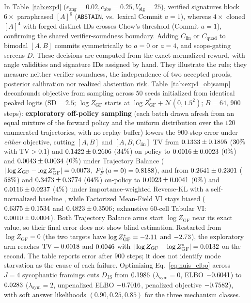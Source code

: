 \documentclass[11pt,a4paper]{article}
\theoremstyle{definition}
\theoremstyle{remark}
\newcommand{\JS}{D_{\mathrm{JS}}}
\begin{document}
In Table~\ref{tab:exp4} ($\epsilon_{\mathrm{ang}} = 0.02, c_{\mathrm{abs}} = 0.25, V_{\mathrm{sig}} = 25$), verified signatures block $6\times$ paraphrased $[A]^6$ (\texttt{ABSTAIN}, vs.\ lexical Commit $a=1$), whereas $4\times$ cloned $[A]^4$ with forged distinct IDs crosses Chow's threshold (Commit $a=1$), confirming the shared verifier-soundness boundary. Adding $C_{\mathrm{lin}}$ or $C_{\mathrm{quad}}$ to bimodal $[A, B]$ commits symmetrically to $a=0$ or $a=4$, and scope-gating screens $D$. These decisions are computed from the exact normalized reward, with angle validities and signature IDs assigned by hand. They illustrate the rule; they measure neither verifier soundness, the independence of two accepted proofs, posterior calibration nor realized abstention risk. Table~\ref{tab:exp4_objsamp} deconfounds objective from sampling across $50$ seeds initialized from identical peaked logits ($\mathrm{SD} = 2.5$; $\log Z_{\mathrm{GF}}$ starts at $\log Z_{\mathrm{GF}}^* + \mathcal{N}(0, 1.5^2)$; $B = 64$, $900$ steps): \textbf{exploratory off-policy sampling} (each batch drawn afresh from an equal mixture of the forward policy and the uniform distribution over the $120$ enumerated trajectories, with no replay buffer) lowers the $900$-step error under \emph{either} objective, cutting $[A, B]$ and $[A, B, C_{\mathrm{lin}}]$ $\mathrm{TV}$ from $0.1333 \pm 0.1895$ ($30\%$ with $\mathrm{TV}>0.1$) and $0.1422 \pm 0.2606$ ($34\%$) on-policy to $0.0016 \pm 0.0023$ ($0\%$) and $0.0043 \pm 0.0034$ ($0\%$) under Trajectory Balance ($|\log Z_{\mathrm{GF}} - \log Z_{\mathrm{GF}}^*| = 0.0073$, $P_F^\top(a=0) = 0.8188$), and from $0.2641 \pm 0.2301$ ($58\%$) and $0.3473 \pm 0.3774$ ($64\%$) on-policy to $0.0023 \pm 0.0041$ ($0\%$) and $0.0116 \pm 0.0237$ ($4\%$) under importance-weighted Reverse-KL with a self-normalized baseline \cite{malkin2023gflownets}, while Factorized Mean-Field VI stays biased ($0.6375 \pm 0.1534$ and $0.4823 \pm 0.3506$; exhaustive $60$-cell Tabular VI: $0.0010 \pm 0.0004$). Both Trajectory Balance arms start $\log Z_{\mathrm{GF}}$ near its exact value, so their final error does not show blind estimation. Restarted from $\log Z_{\mathrm{GF}} = 0$ (the two targets have $\log Z_{\mathrm{GF}}^* = -2.11$ and $-2.73$), the exploratory arm reaches $\mathrm{TV} = 0.0018$ and $0.0046$ with $|\log Z_{\mathrm{GF}} - \log Z_{\mathrm{GF}}^*| = 0.0132$ on the second. The table reports error after $900$ steps; it does not identify mode starvation as the cause of each failure. Optimizing Eq.~\eqref{eq:nuis_elbo} across $J=4$ sycophantic framings cuts $\JS$ from $0.1986$ ($\lambda_{\mathrm{sym}}=0$, ELBO $-0.6041$) to $0.0283$ ($\lambda_{\mathrm{sym}}=2$, unpenalized ELBO $-0.7016$, penalized objective $-0.7582$), with soft answer likelihoods $(0.90, 0.25, 0.85)$ for the three mechanism classes.
\end{document}

